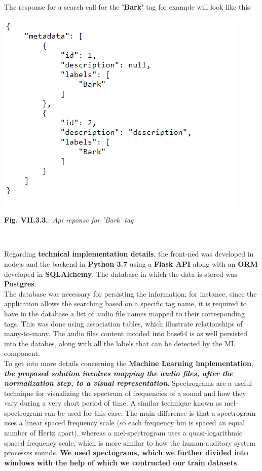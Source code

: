 \documentclass[11pt, a4papper]{report}
\theoremstyle{plain}
\theoremstyle{definition}
\theoremstyle{definition}
\theoremstyle{proposition}
\begin{document}
The response for a search call for the \textbf{'Bark'} tag for example will look like this:

\begin{center}
\includegraphics[scale=0.5]{mocked-api-response.png}
\end{center}
\begin{center}
\textbf{Fig. VII.3.3.}: \textit{Api reponse for 'Bark' tag}
\end{center}
\

Regarding \textbf{technical implementation details}, the front-ned was developed in nodejs and the backend in \textbf{Python 3.7} using a \textbf{Flask API} along with an \textbf{ORM} developed in \textbf{SQLAlchemy}. The database in which the data is stored was \textbf{Postgres}.
\\

The database was necessary for persisting the information; for instance, since the application allows the searching based on a specific tag name, it is required to have in the database a list of audio file names mapped to their corresponding tags. This was done using association tables, which illustrate relationships of many-to-many. The audio files content incoded into base64 is as well persisted into the databes, along with all the labels that can be detected by the ML component.
\\

To get into more details concerning the \textbf{Machine Learning implementation}, \textbf{\textit{the proposed solution involves mapping the audio files, after the normalization step, to a visual representation}}. Spectrograms are a useful technique for visualizing the spectrum of frequencies of a sound and how they vary during a very short period of time. A similar technique known as mel-spectrogram can be used for this case. The main difference is that a spectrogram uses a linear spaced frequency scale (so each frequency bin is spaced an equal number of Hertz apart), whereas a mel-spectrogram uses a quasi-logarithmic spaced frequency scale, which is more similar to how the human auditory system processes sounds. \textbf{We used spectograms, which we further divided into windows with the help of which we contructed our train datasets}. 
\end{document}
